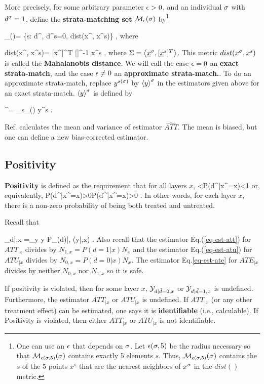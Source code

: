 More precisely, 
for some arbitrary
parameter $\epsilon>0$,
and an individual $\sigma$
with $d^\sigma=1$,
define
the {\bf strata-matching set} 
${\cal M}_{\epsilon}(\sigma)$ by\footnote{
One can use an $\epsilon$
that depends on $\sigma$.
Let $\epsilon(\sigma, 5)$
be the radius necessary
so that ${\cal M}_{\epsilon(\sigma, 5)}(\sigma)$
contains exactly 5 elements $s$.
Thus, ${\cal M}_{\epsilon(\sigma, 5)}(\sigma)$
contains the $s$ of the
 5 points $x^s$ that are the
nearest neighbors of $x^\sigma$
in the $dist()$ metric.}

\beq
\calm_{\eps}(\s)=
\{s: d^, d^s=0, 
dist(x^\s, x^s)\leq \eps \}
\;,
\eeq
where

\beq
dist(x^\s, x^s)=
[x^\s]^T [\Sigma]^{-1} x^s
\;,
\eeq
where $\Sigma = \left\langle{\underline{x}}^\sigma, [{\underline{x}}^s]^T\right\rangle$.
 This
metric $dist(x^\sigma, x^s)$ is
called the {\bf Mahalanobis distance}.
We will call
the case $\epsilon=0$ an {\bf  exact strata-match},
and
the case
$\epsilon\neq 0$ 
 an {\bf approximate strata-match.}.
To do an approximate strata-match,
replace $y^{s(\sigma)}$ 
by
$\left\langle y\right\rangle^\sigma$ 
in 
the estimators 
given above 
for an exact strata-match.
$\left\langle y\right\rangle^\sigma$ 
is defined by

\beq
{}^\s=
\sum_{s\in \calm_{\eps}(\s)}
y^s
\;.
\eeq

Ref.\cite{book-mixtape}
calculates the mean and variance
of estimator $\widehat{ATT}$. 
The mean is biased,
but one can define a new
bias-corrected estimator.


\subsection{Positivity}


{\bf Positivity} is defined as the
requirement that for all layers $x$,
<P(d^|x^\s=x)<1
\eeq
or, equivalently, 
\beq
P(d^|x^\s=x)>0P(d^|x^\s=x)>0
\;.
\eeq
In other words, 
for each layer $x$,
there is
a non-zero
probability of being both treated 
and untreated.

Recall that

\beq
\caly_{d|\td,x}
=\sum_{y} y P_{\rvy(d)|\rvtd, \rvx}(y|\td,x)
\;.
\eeq
Also recall
that the estimator
Eq.(\ref{eq-est-att})
for $ATT_{|x}$ divides by $N_{1,x}=P(d=1|x)N_x$
and 
the estimator
Eq.(\ref{eq-est-atu})
for $ATU_{|x}$ divides by $N_{0,x}= P(d=0|x)N_x$.
The estimator Eq.\ref{eq-est-ate}
for $ATE_{|x}$ divides by neither $N_{0,x}$
nor $N_{1,x}$ so it is safe.

If positivity is violated,
then 
for some 
layer $x$, 
 ${\cal Y}_{d|{\tilde{d}}=0,x}$ or ${\cal Y}_{d|{\tilde{d}}=1,x}$ 
is undefined. 
Furthermore,  the estimator
$ATT_{|x}$ or $ATU_{|x}$ is undefined.
If $ATT_{|x}$ (or any
other treatment effect)  can be estimated,
one says it is {\bf identifiable} (i.e.,
calculable). If Positivity is violated, then
either $ATT_{|x}$ or $ATU_{|x}$ is not identifiable.

